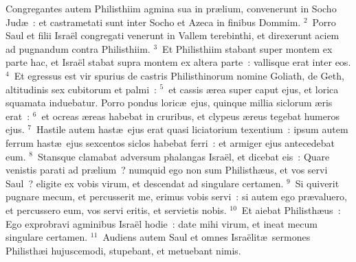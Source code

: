 \lettrine[lines=10,image=true,loversize=0.05,lraise=-0.03]{C}{}ongregantes autem Philisthiim agmina sua in pr\ae lium, convenerunt in Socho Jud\ae~: et castrametati sunt inter Socho et Azeca in finibus Dommim.
${}^{2}$~Porro Saul et filii Isra\"el congregati venerunt in Vallem terebinthi, et direxerunt aciem ad pugnandum contra Philisthiim.
${}^{3}$~Et Philisthiim stabant super montem ex parte hac, et Isra\"el stabat supra montem ex altera parte~: vallisque erat inter eos.
${}^{4}$~Et egressus est vir spurius de castris Philisthinorum nomine Goliath, de Geth, altitudinis sex cubitorum et palmi~:
${}^{5}$~et cassis \ae rea super caput ejus, et lorica squamata induebatur. Porro pondus loric\ae\ ejus, quinque millia siclorum \ae ris erat~:
${}^{6}$~et ocreas \ae reas habebat in cruribus, et clypeus \ae reus tegebat humeros ejus.
${}^{7}$~Hastile autem hast\ae\ ejus erat quasi liciatorium texentium~: ipsum autem ferrum hast\ae\ ejus sexcentos siclos habebat ferri~: et armiger ejus antecedebat eum.
${}^{8}$~Stansque clamabat adversum phalangas Isra\"el, et dicebat eis~: Quare venistis parati ad pr\ae lium~? numquid ego non sum Philisth\ae us, et vos servi Saul~? eligite ex vobis virum, et descendat ad singulare certamen.
${}^{9}$~Si quiverit pugnare mecum, et percusserit me, erimus vobis servi~: si autem ego pr\ae valuero, et percussero eum, vos servi eritis, et servietis nobis.
${}^{10}$~Et aiebat Philisth\ae us~: Ego exprobravi agminibus Isra\"el hodie~: date mihi virum, et ineat mecum singulare certamen.
${}^{11}$~Audiens autem Saul et omnes Isra\"elit\ae\ sermones Philisth\ae i hujuscemodi, stupebant, et metuebant nimis.


